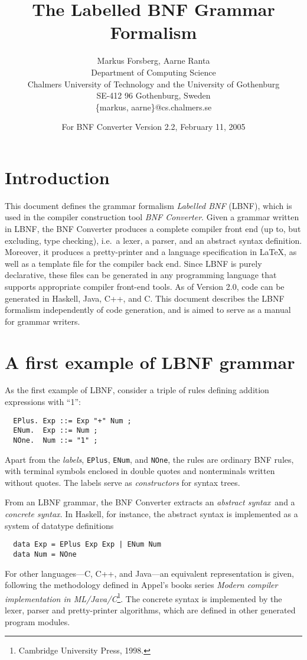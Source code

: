 \documentclass[10pt]{article}
\title{{\bf The Labelled BNF Grammar Formalism}}
\author{Markus Forsberg, Aarne Ranta \\
  Department of Computing Science \\
  Chalmers University of Technology and the University of Gothenburg \\
  SE-412 96 Gothenburg, Sweden\\
  \{markus, aarne\}@cs.chalmers.se}
\date{For BNF Converter Version 2.2, February 11, 2005}
\begin{document}
\maketitle


\section{Introduction}

This document defines
the grammar formalism \textit{Labelled BNF} (LBNF), 
which is used in the compiler construction tool
\textit{BNF Converter}.
Given a grammar written in LBNF,
the BNF Converter produces a complete compiler 
front end (up to, but excluding, type checking), 
i.e.\ a lexer, a parser, and an abstract 
syntax definition. Moreover, it produces a pretty-printer 
and a language specification in \LaTeX, as well as 
a template file for the compiler back end.
Since LBNF is purely declarative,
these files can be generated in any programming language that supports
appropriate compiler front-end tools. As of Version 2.0, code can be generated
in Haskell, Java, C++, and C.
This document describes the LBNF formalism independently of code generation,
and is aimed to serve as a manual for grammar writers.



\section{A first example of LBNF grammar}

As the first example of LBNF, 
consider a triple of rules defining addition expressions with ``1'':
\begin{verbatim}
  EPlus. Exp ::= Exp "+" Num ;
  ENum.  Exp ::= Num ;
  NOne.  Num ::= "1" ;
\end{verbatim}
Apart from the \textit{labels}, {\tt EPlus}, {\tt ENum}, and {\tt NOne}, 
the rules are
ordinary BNF rules, with terminal symbols enclosed in
double quotes and nonterminals written without quotes.
The labels serve as \textit{constructors} for
syntax trees.

From an LBNF grammar, the BNF Converter extracts 
an \textit{abstract syntax}\ and  
a \textit{concrete syntax}.
In Haskell, for instance,
the abstract syntax is implemented as a system of
datatype definitions
\begin{verbatim}
  data Exp = EPlus Exp Exp | ENum Num
  data Num = NOne
\end{verbatim}
For other languages---C, C++, and Java---an equivalent
representation is given, following
the methodology defined in Appel's books series
{\em Modern compiler implementation in ML/Java/C}\footnote{
Cambridge University Press, 1998.}.
The concrete syntax is implemented by the
lexer, parser and pretty-printer algorithms,
which are defined in other generated program modules.
\end{document}
